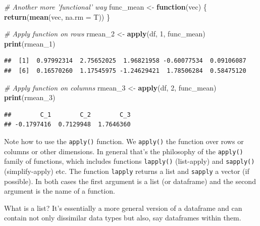 \documentclass[12pt,]{article}
\newenvironment{Shaded}{\begin{snugshade}}{\end{snugshade}}
\newcommand{\KeywordTok}[1]{\textcolor[rgb]{0.13,0.29,0.53}{\textbf{#1}}}
\newcommand{\DataTypeTok}[1]{\textcolor[rgb]{0.13,0.29,0.53}{#1}}
\newcommand{\DecValTok}[1]{\textcolor[rgb]{0.00,0.00,0.81}{#1}}
\newcommand{\StringTok}[1]{\textcolor[rgb]{0.31,0.60,0.02}{#1}}
\newcommand{\CommentTok}[1]{\textcolor[rgb]{0.56,0.35,0.01}{\textit{#1}}}
\newcommand{\ControlFlowTok}[1]{\textcolor[rgb]{0.13,0.29,0.53}{\textbf{#1}}}
\newcommand{\NormalTok}[1]{#1}
\begin{document}
\begin{Shaded}
\begin{Highlighting}[]
\CommentTok{# Another more 'functional' way}
\NormalTok{func_mean <-}\StringTok{ }\ControlFlowTok{function}\NormalTok{(vec)}
\NormalTok{\{}
  \KeywordTok{return}\NormalTok{(}\KeywordTok{mean}\NormalTok{(vec, }\DataTypeTok{na.rm =}\NormalTok{ T))}
\NormalTok{\}}

\CommentTok{# Apply function on rows}
\NormalTok{rmean_}\DecValTok{2}\NormalTok{ <-}\StringTok{ }\KeywordTok{apply}\NormalTok{(df, }\DecValTok{1}\NormalTok{, func_mean) }
\KeywordTok{print}\NormalTok{(rmean_}\DecValTok{1}\NormalTok{)}
\end{Highlighting}
\end{Shaded}

\begin{verbatim}
##  [1]  0.97992314  2.75652025  1.96821958 -0.60077534  0.09106087
##  [6]  0.16570260  1.17545975 -1.24629421  1.78506284  0.58475120
\end{verbatim}

\begin{Shaded}
\begin{Highlighting}[]
\CommentTok{# Apply function on columns}
\NormalTok{rmean_}\DecValTok{3}\NormalTok{ <-}\StringTok{ }\KeywordTok{apply}\NormalTok{(df, }\DecValTok{2}\NormalTok{, func_mean)}
\KeywordTok{print}\NormalTok{(rmean_}\DecValTok{3}\NormalTok{)}
\end{Highlighting}
\end{Shaded}

\begin{verbatim}
##        C_1        C_2        C_3 
## -0.1797416  0.7129948  1.7646360
\end{verbatim}

Note how to use the \texttt{apply()} function. We \texttt{apply()} the
function over rows or columns or other dimensions. In general that's the
philosophy of the \texttt{apply()} family of functions, which includes
functions \texttt{lapply()} (list-apply) and \texttt{sapply()}
(simplify-apply) etc. The function \texttt{lapply} returns a list and
\texttt{sapply} a vector (if possible). In both cases the first argument
is a list (or dataframe) and the second argument is the name of a
function.

What is a list? It's essentially a more general version of a dataframe
and can contain not only dissimilar data types but also, say dataframes
within them.
\end{document}
